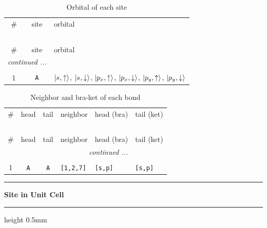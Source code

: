 \documentclass[fleqn,10pt,landscape]{jsarticle}
\begin{document}
\renewcommand{\arraystretch}{1.6}
\begin{longtable}[l]{ccl}
\captionsetup{justification=raggedright, singlelinecheck=off}
\caption{Orbital of each site}
 \\
 \hline \hline
\# & site & orbital \\ \hline \endfirsthead

\multicolumn{2}{l}{\tablename\ \thetable{}} \\
 \hline \hline
\# & site & orbital \\ \hline \endhead

 \hline \hline
\multicolumn{2}{r}{\footnotesize\it continued ...} \\ \endfoot

 \hline \hline
\multicolumn{2}{r}{} \\ \endlastfoot

1 & \texttt{A} & $\ket{s_{},\uparrow}$, $\ket{s_{},\downarrow}$, $\ket{p_{x},\uparrow}$, $\ket{p_{x},\downarrow}$, $\ket{p_{y},\uparrow}$, $\ket{p_{y},\downarrow}$ \\
\end{longtable}
\renewcommand{\arraystretch}{1.6}
\begin{longtable}[l]{ccclll}
\captionsetup{justification=raggedright, singlelinecheck=off}
\caption{Neighbor and bra-ket of each bond}
 \\
 \hline \hline
\# & head & tail & neighbor & head (bra) & tail (ket) \\ \hline \endfirsthead

\multicolumn{5}{l}{\tablename\ \thetable{}} \\
 \hline \hline
\# & head & tail & neighbor & head (bra) & tail (ket) \\ \hline \endhead

 \hline \hline
\multicolumn{5}{r}{\footnotesize\it continued ...} \\ \endfoot

 \hline \hline
\multicolumn{5}{r}{} \\ \endlastfoot

1 & \texttt{A} & \texttt{A} & \texttt{[1,2,7]} & \texttt{[s,p]} & \texttt{[s,p]} \\
\end{longtable}
\vspace{5mm}
\noindent \rule[0.5mm]{5mm}{0.5mm}\hspace{3mm}\textbf{Site in Unit Cell}\hspace{3mm}\leaders\hrule height 0.5mm\hfill\kern0pt
\vspace{3mm}
\end{document}
